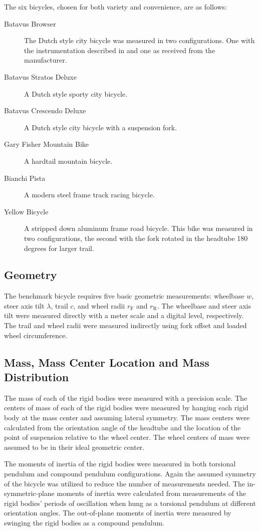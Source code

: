 \documentclass{bmd2010a}
\begin{document}
The six bicycles, chosen for both variety and convenience, are as follows:
\begin{description}
    \item[Batavus Browser] The Dutch style city bicycle was measured
        in two configurations. One with the instrumentation described in
        \cite{Kooijman2009a} and one as received from the manufacturer.
    \item[Batavus Stratos Deluxe] A Dutch style sporty city bicycle.
    \item[Batavus Crescendo Deluxe] A Dutch style city bicycle with a
        suspension fork.
    \item[Gary Fisher Mountain Bike] A hardtail mountain bicycle.
    \item[Bianchi Pista] A modern steel frame track racing bicycle.
    \item[Yellow Bicycle] A stripped down aluminum frame road bicycle. This
        bike was measured in two configurations, the second with the fork
        rotated in the headtube 180 degrees for larger trail.
\end{description}
\subsection*{Geometry}
The benchmark bicycle requires five basic geometric measurements: wheelbase
$w$, steer axis tilt $\lambda$, trail $c$, and wheel radii $r_\mathrm{F}$
and $r_\mathrm{R}$. The wheelbase and steer axis tilt were measured directly
with a meter scale and a digital level, respectively. The trail and wheel radii were
measured indirectly using fork offset and loaded wheel circumference.
\subsection*{Mass, Mass Center Location and Mass Distribution}
The mass of each of the rigid bodies were measured with a precision scale.
The centers of mass of each of the rigid bodies were measured by hanging each
rigid body at the mass center and assuming lateral symmetry. The mass centers
were calculated from the orientation angle of the headtube and the location of
the point of suspension relative to the wheel center.
The wheel centers of mass were assumed to be in their ideal
geometric center.

The moments of inertia of the rigid bodies were measured in both torsional
pendulum and compound pendulum configurations. Again the assumed symmetry of the
bicycle was utilized to reduce the number of measurements needed. The
in-symmetric-plane moments of inertia were calculated from measurements of the
rigid bodies' periods of oscillation when hung as a torsional pendulum at
different orientation angles. The out-of-plane moments of inertia were
measured by swinging the rigid bodies as a compound pendulum.
\end{document}
